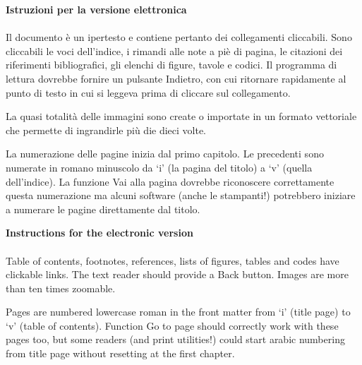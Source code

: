 \begin{center} {\bfseries Istruzioni per la versione elettronica} \end{center}
\paragraph{}
	Il documento \`e un ipertesto e contiene pertanto dei collegamenti cliccabili.
	Sono cliccabili le voci dell'indice,
	i rimandi alle note a pi\`e di pagina,
	le citazioni dei riferimenti bibliografici,
	gli elenchi di figure, tavole e codici.
	Il programma di lettura dovrebbe fornire un pulsante \textsf{Indietro},
	con cui ritornare rapidamente al punto di testo in cui si leggeva
	prima di cliccare sul collegamento.
	
	La quasi totalit\`a delle immagini sono create o importate in un formato vettoriale
	che permette di ingrandirle pi\`u die dieci volte.
	
	La numerazione delle pagine inizia dal primo capitolo.
	Le precedenti sono numerate in romano minuscolo
	da `i' (la pagina del titolo) a `v' (quella dell'indice).
	La funzione \textsf{Vai alla pagina} dovrebbe
	riconoscere correttamente questa numerazione
	ma alcuni software (anche le stampanti!) potrebbero iniziare 
	a numerare le pagine direttamente dal titolo.
																\vspace{1in}
\begin{center} {\bfseries Instructions for the electronic version} \end{center}
\paragraph{}	
	Table of contents, footnotes, references,
	lists of figures, tables and codes have clickable links.
	The text reader should provide a \textsf{Back} button. 
	Images are more than ten times zoomable.
	
	Pages are numbered lowercase roman in the front matter
	from `i' (title page) to `v' (table of contents).
	Function \textsf{Go to page} should correctly work with these pages too,
	but some readers (and print utilities!) could start arabic numbering from title page
	without resetting at the first chapter.